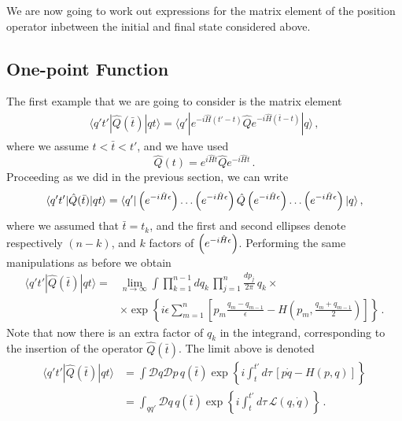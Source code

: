 We are now going to work out expressions for the matrix element of the
position operator inbetween the initial and final state considered
above. 

\subsection{One-point Function}
\label{sec:one-point-function}

The first example that we are going to consider is the matrix element
\begin{align}
  \label{eq:OnePtDef}
  \langle q't' | \hat{Q}(\bar{t}) | q t\rangle = 
  \langle q' | e^{-i \hat{H}(t'-t)} \hat{Q} e^{-i \hat{H}(\bar{t}-t)}
  | q\rangle\, ,
\end{align}
where we assume $t<\bar{t}<t'$, and we have used
\begin{equation}
  \label{eq:HeisenOpEvol}
  \hat{Q}(t) = e^{i\hat{H} t} \hat{Q} e^{-i\hat{H} t}\, .
\end{equation}
Proceeding as we did in the previous section, we can write
\begin{align}
  \label{eq:CorrOne}
  \langle q't' | \hat{Q}(\bar{t}) | q t\rangle = 
  \langle q' | \left(e^{-i \hat{H} \epsilon}\right) \ldots \left(e^{-i \hat{H} \epsilon}\right) \hat{Q} \left(e^{-i \hat{H} \epsilon}\right) \ldots
  \left(e^{-i \hat{H} \epsilon}\right) | q \rangle\, ,
\end{align}
where we assumed that $\bar{t}=t_k$, and the first and second ellipses
denote respectively $(n-k)$, and $k$ factors of $\left(e^{-i \hat{H} \epsilon}\right)$. Performing
the same manipulations as before we obtain
\begin{align}
  \langle q't' | \hat{Q}(\bar{t}) | q t\rangle =& 
  \lim_{n\to\infty} \int \prod_{k=1}^{n-1}dq_k\, 
  \prod_{j=1}^{n} \frac{dp_j}{2\pi}\, q_k \times \\
  &\times \exp \left\{
    i\epsilon \sum_{m=1}^{n} \left[
    p_m \frac{q_m-q_{m-1}}{\epsilon} - H\left(p_m, 
    \frac{q_m+q_{m-1}}{2}\right)
    \right]
    \right\}\, .
\end{align}
Note that now there is an extra factor of $q_k$ in the integrand,
corresponding to the insertion of the operator $\hat{Q}(\bar{t})$. The
limit above  is denoted
\begin{align}
  \langle q't' | \hat{Q}(\bar{t}) | q t\rangle &= 
  \int \mathcal{D}q \mathcal{D}p \, q(\bar{t}) 
  \exp \left\{
  i \int_t^{t'} d\tau\, \left[
  p \dot{q} - H(p,q)
  \right]
  \right\}\\
&= \int_{qq'} \mathcal{D}q \, q(\bar{t}) 
  \exp \left\{
  i \int_t^{t'} d\tau\, \mathcal{L}(q,\dot{q})
  \right\}\, .
\end{align}

